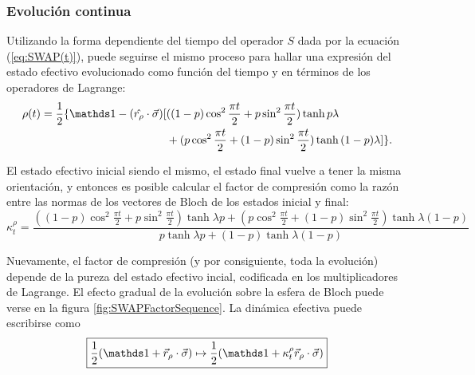 \subsubsection{Evolución continua}
Utilizando la forma dependiente del tiempo del operador $S$ dada por la ecuación (\ref{eq:SWAP(t)}), puede seguirse el mismo proceso para hallar una expresión del estado efectivo evolucionado como función del tiempo y en términos de los operadores de Lagrange:
\begin{align}
  \begin{split}
  \rho(t)=\frac{1}{2}\{\Id-(\hat{r_{\rho}}\cdot\vec{\sigma})[&((1-p)\cos^{2}{\frac{\pi t}{2}}+p\sin^{2}{\frac{\pi t}{2}})\tanh{p\lambda}\\
  &+(p\cos^{2}{\frac{\pi t}{2}}+(1-p)\sin^{2}{\frac{\pi t}{2}})\tanh{(1-p)\lambda}]\}.
  \end{split}
\end{align}

El estado efectivo inicial siendo el mismo, el estado final vuelve a tener la misma orientación, y entonces es posible calcular el factor de compresión como la razón entre las normas de los vectores de Bloch de los estados inicial y final:
\begin{equation}\label{eq:SWAPFactort}
  \kappa_{t}^{\rho}=\frac{((1-p)\cos^{2}{\frac{\pi t}{2}}+p\sin^{2}{\frac{\pi t}{2}})\tanh{\lambda p}+(p\cos^{2}{\frac{\pi t}{2}}+(1-p)\sin^{2}{\frac{\pi t}{2}})\tanh{\lambda (1-p)}}{
    p\tanh{\lambda p}+(1-p)\tanh{\lambda (1-p)}}
\end{equation}

Nuevamente, el factor de compresión (y por consiguiente, toda la evolución) depende de la pureza del estado efectivo incial, codificada en los multiplicadores de Lagrange. El efecto gradual de la evolución sobre la esfera de Bloch puede verse en la figura \ref{fig:SWAPFactorSequence}. La dinámica efectiva puede escribirse como
\begin{equation}\label{eq:EffectiveSWAPt}
  \boxed{\frac{1}{2}(\Id+\vec{r}_{\rho}\cdot\vec{\sigma}) \mapsto \frac{1}{2}(\Id+\kappa_{t}^{\rho}\vec{r}_{\rho}\cdot\vec{\sigma})}
\end{equation}

